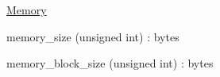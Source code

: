\begin{DoxyItemize}
\begin{DoxyItemize}
\begin{DoxyItemize}
\end{DoxyItemize}
\item {\ttfamily \mbox{\hyperlink{classMemory}{Memory}}}
\begin{DoxyItemize}
\item {\ttfamily memory\+\_\+size} (unsigned int) \+: bytes
\item {\ttfamily memory\+\_\+block\+\_\+size} (unsigned int) \+: bytes ~\newline
 
\end{DoxyItemize}
\end{DoxyItemize}
\end{DoxyItemize}